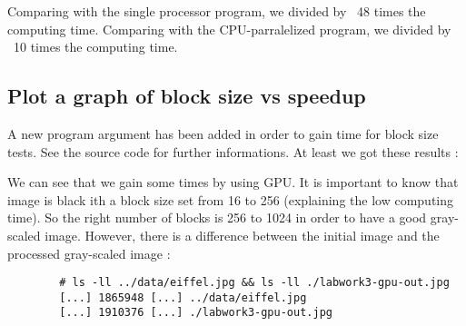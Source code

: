 \documentclass{article}
\begin{document}
    Comparing with the single processor program, we divided by ~48 times the computing time. 
    Comparing with the CPU-parralelized program, we divided by ~10 times the computing time. 
    
\subsection{Plot a graph of block size vs speedup}
    A new program argument has been added in order to gain time for block size tests. See the source code for further informations. 
    \newline
    At least we got these results :
    \newline
    \newline
    We can see that we gain some times by using GPU. It is important to know that image is black ith a block size set from 16 to 256 (explaining the low computing time). So the right number of blocks is 256 to 1024 in order to have a good gray-scaled image. 
    \newLine 
    However, there is a difference between the initial image and the processed gray-scaled image : 
    
    \begin{verbatim}
        # ls -ll ../data/eiffel.jpg && ls -ll ./labwork3-gpu-out.jpg
        [...] 1865948 [...] ../data/eiffel.jpg
        [...] 1910376 [...] ./labwork3-gpu-out.jpg

    \end{verbatim}
    
\end{document}

